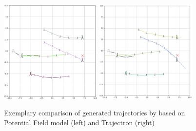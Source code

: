 \begin{figure}[!ht]
\begin{center}
\includegraphics[width=0.45\textwidth]{images/show_case_ipopt.png}
\includegraphics[width=0.45\textwidth]{images/impact_env_trajectron.png}
\end{center}
\caption{Exemplary comparison of generated trajectories by based on Potential Field model (left) and Trajectron \cite{Ivanovic2018} (right)}
\label{img:effect_pred}
\end{figure}